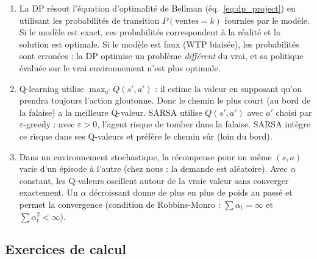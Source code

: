 \documentclass[11pt,a4paper]{article}
\begin{document}
\begin{enumerate}[start=7]
\item La DP résout l'équation d'optimalité de Bellman (éq.~\ref{eq:dp_project}) en utilisant les probabilités de transition $P(\text{ventes} = k)$ fournies par le modèle. Si le modèle est exact, ces probabilités correspondent à la réalité et la solution est optimale. Si le modèle est faux (WTP biaisée), les probabilités sont erronées : la DP optimise un problème \textit{différent} du vrai, et sa politique évaluée sur le vrai environnement n'est plus optimale.

\item Q-learning utilise $\max_{a'} Q(s', a')$ : il estime la valeur en supposant qu'on prendra toujours l'action gloutonne. Donc le chemin le plus court (au bord de la falaise) a la meilleure Q-valeur. SARSA utilise $Q(s', a')$ avec $a'$ choisi par $\varepsilon$-greedy : avec $\varepsilon > 0$, l'agent risque de tomber dans la falaise. SARSA intègre ce risque dans ses Q-valeurs et préfère le chemin sûr (loin du bord).

\item Dans un environnement stochastique, la récompense pour un même $(s, a)$ varie d'un épisode à l'autre (chez nous : la demande est aléatoire). Avec $\alpha$ constant, les Q-valeurs oscillent autour de la vraie valeur sans converger exactement. Un $\alpha$ décroissant donne de plus en plus de poids au passé et permet la convergence (condition de Robbins-Monro : $\sum \alpha_t = \infty$ et $\sum \alpha_t^2 < \infty$).
\end{enumerate}

\subsection{Exercices de calcul}
\end{document}

